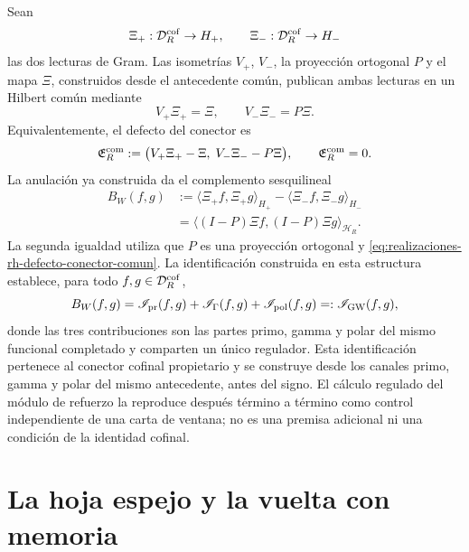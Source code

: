 Sean
\[
 \Xi_+:\mathcal D_R^{\rm cof}\to H_+,
 \qquad
 \Xi_-:\mathcal D_R^{\rm cof}\to H_-
\]
las dos lecturas de Gram. Las isometrías \(V_+\), \(V_-\), la proyección
ortogonal \(P\) y el mapa \(\Xi\), construidos desde el antecedente común,
publican ambas lecturas en un Hilbert común mediante
\begin{equation}\label{eq:realizaciones-rh-publicaciones-comunes}
 V_+\Xi_+=\Xi,
 \qquad V_-\Xi_-=P\Xi.
\end{equation}
Equivalentemente, el defecto del conector es
\begin{equation}\label{eq:realizaciones-rh-defecto-conector-comun}
 \mathfrak E_R^{\rm com}
 :=\bigl(V_+\Xi_+-\Xi,\;V_-\Xi_--P\Xi\bigr),
 \qquad
 \mathfrak E_R^{\rm com}=0.
\end{equation}
La anulación ya construida da el complemento sesquilineal
\begin{equation}\label{eq:realizaciones-rh-bw}
 \begin{aligned}
 B_W(f,g)
 &:=\langle\Xi_+f,\Xi_+g\rangle_{H_+}
   -\langle\Xi_-f,\Xi_-g\rangle_{H_-}\\
 &=\langle(I-P)\Xi f,(I-P)\Xi g\rangle_{\mathcal H_R}.
 \end{aligned}
\end{equation}
La segunda igualdad utiliza que \(P\) es una proyección ortogonal y
\eqref{eq:realizaciones-rh-defecto-conector-comun}. La identificación
construida en esta estructura establece, para todo
\(f,g\in\mathcal D_R^{\rm cof}\),
\begin{equation}\label{eq:realizaciones-rh-identificacion-gw}
 B_W(f,g)=
 \mathscr I_{\rm pr}(f,g)+
 \mathscr I_{\Gamma}(f,g)+
 \mathscr I_{\rm pol}(f,g)
 =:\mathscr I_{\rm GW}(f,g),
\end{equation}
donde las tres contribuciones son las partes primo, gamma y polar del mismo
funcional completado y comparten un único regulador.
Esta identificación pertenece al conector cofinal propietario y se construye
desde los canales primo, gamma y polar del mismo antecedente, antes del signo.
El cálculo regulado del módulo de refuerzo la reproduce después término a
término como control independiente de una carta de ventana; no es una premisa
adicional ni una condición de la identidad cofinal.

\section*{La hoja espejo y la vuelta con memoria}

